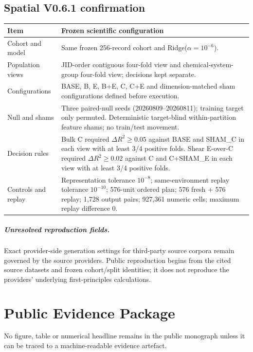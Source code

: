 \documentclass[11pt,a4paper,oneside]{report}
\begin{document}
\section*{Spatial V0.6.1 confirmation}
\begin{longtable}{p{}p{}}
\toprule Item & Frozen scientific configuration\\\midrule
Cohort and model & Same frozen 256-record cohort and Ridge($\alpha=10^{-6}$).\\
Population views & JID-order contiguous four-fold view and chemical-system-group four-fold view; decisions kept separate.\\
Configurations & BASE, B, E, B+E, C, C+E and dimension-matched sham configurations defined before execution.\\
Null and shams & Three paired-null seeds (20260809--20260811); training target only permuted. Deterministic target-blind within-partition feature shams; no train/test movement.\\
Decision rules & Bulk C required $\Delta R^2\ge0.05$ against BASE and SHAM\_C in each view with at least 3/4 positive folds. Shear E-over-C required $\Delta R^2\ge0.02$ against C and C+SHAM\_E in each view with at least 3/4 positive folds.\\
Controls and replay & Representation tolerance $10^{-8}$; same-environment replay tolerance $10^{-10}$; 576-unit ordered plan; 576 fresh + 576 replay; 1,728 output pairs; 927,361 numeric cells; maximum replay difference 0.\\
\bottomrule
\end{longtable}

\paragraph{Unresolved reproduction fields.} Exact provider-side generation settings for third-party source corpora remain governed by the source providers. Public reproduction begins from the cited source datasets and frozen cohort/split identities; it does not reproduce the providers' underlying first-principles calculations.

\chapter{Public Evidence Package}
\label{appendix:public-evidence}

\begin{evidencebox}
No figure, table or numerical headline remains in the public monograph unless it can be traced to a machine-readable evidence artefact.
\end{evidencebox}
\end{document}
